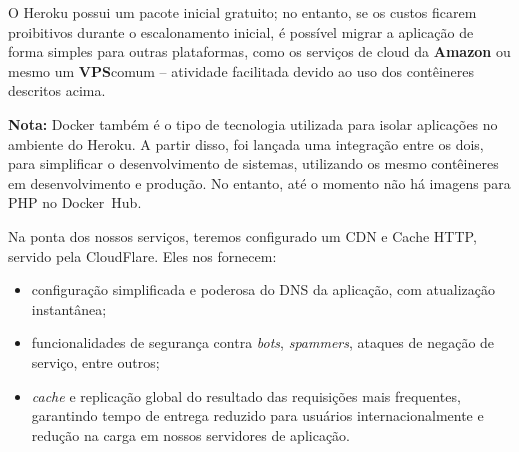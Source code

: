 \documentclass[12pt,a4paper,twoside,hyphens,english,brazil]{abntex2}
\begin{document}
{O Heroku possui um pacote inicial gratuito; no entanto, se os custos ficarem proibitivos durante o escalonamento inicial, é possível migrar a aplicação de forma simples para outras plataformas, como os serviços de cloud da \textbf{Amazon} ou mesmo um \textbf{VPS}\footnotemark comum -- atividade facilitada devido ao uso dos contêineres descritos acima.


\begin{minipage}{\linewidth} 
	\begin{framed}
		\textbf{Nota:} Docker também é o tipo de tecnologia utilizada para isolar aplicações no ambiente do Heroku. A partir disso, foi lançada uma integração entre os dois, para simplificar o desenvolvimento de sistemas, utilizando os mesmo contêineres em desenvolvimento e produção.\cite{heroku-docker} No entanto, até o momento não há imagens para PHP no Docker~Hub\cite{heroku-dockerhub}\cite{heroku-docker-php}.
		
	\end{framed}
\end{minipage}

Na ponta dos nossos serviços, teremos configurado um CDN e Cache HTTP, servido pela CloudFlare. Eles nos fornecem:
\begin{itemize}
	\item configuração simplificada e poderosa do DNS da aplicação, com atualização instantânea;
	\item funcionalidades de segurança contra \emph{bots}, \emph{spammers}, ataques de negação de serviço, entre outros;
	\item \emph{cache} e replicação global do resultado das requisições mais frequentes, garantindo tempo de entrega reduzido para usuários internacionalmente e redução na carga em nossos servidores de aplicação.
\end{itemize}

}
\end{document}
